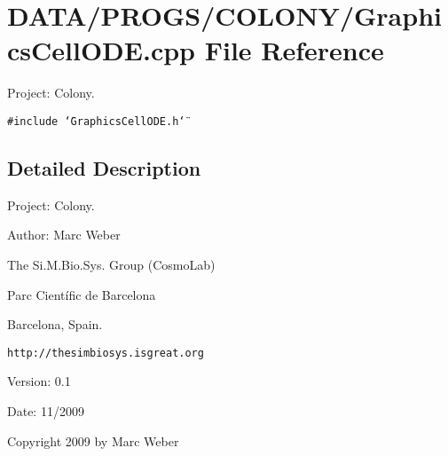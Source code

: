 \section{DATA/PROGS/COLONY/GraphicsCellODE.cpp File Reference}
\label{GraphicsCellODE_8cpp}
Project: Colony. 

{\tt \#include \char`\"{}GraphicsCellODE.h\char`\"{}}\par


\subsection{Detailed Description}
Project: Colony. 

\begin{Desc}
\item[Author:]Marc Weber\par
 The Si.M.Bio.Sys. Group (CosmoLab)\par
 Parc Científic de Barcelona\par
 Barcelona, Spain.\par
 {\tt http://thesimbiosys.isgreat.org} \end{Desc}
\begin{Desc}
\item[Version:]0.1 \end{Desc}
\begin{Desc}
\item[Date:]11/2009\end{Desc}
Copyright 2009 by Marc Weber 